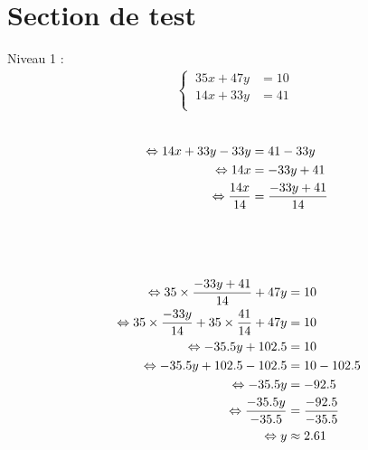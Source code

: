 \documentclass{article}%
\begin{document}
%
\normalsize%
\fontsize{12}{10}%
\selectfont%
\section*{Section de test}%
\label{sec:Sectiondetest}%
Niveau 1 :%
\begin{align*}%
\begin{cases}%
\  35x + 47y &= 10 \\%
\  14x + 33y &= 41 \\%
\end{cases}%
\\%
\end{align*}%
\ \\%
\vspace{5mm}%
\newline%
\begin{align*}%
\  \Leftrightarrow 14x + 33y - 33y &= 41 - 33y \\%
\vspace{5mm}%
\newline%
\  \Leftrightarrow 14x &= -33y + 41\\%
\vspace{5mm}%
\newline%
\  \Leftrightarrow \frac{14x}{14} &= \frac{-33y + 41}{14}\\%
\vspace{5mm}%
\newline%
\end{align*}%
\\%
\ \\%
\vspace{5mm}%
\newline%
\begin{align*}%
\ \Leftrightarrow  35 \times \frac{-33y + 41}{14} + 47y &= 10\\%
\vspace{5mm}%
\newline%
\ \Leftrightarrow  35 \times \frac{-33y}{14} + 35 \times \frac{41}{14} + 47y &= 10\\%
\vspace{5mm}%
\newline%
\ \Leftrightarrow  -35.5y + 102.5 &= 10\\%
\vspace{5mm}%
\newline%
\ \Leftrightarrow  -35.5y + 102.5 - 102.5 &= 10 - 102.5\\%
\vspace{5mm}%
\newline%
\ \Leftrightarrow  -35.5y  &= -92.5\\%
\vspace{5mm}%
\newline%
\ \Leftrightarrow  \frac{-35.5y}{-35.5}  &= \frac{-92.5}{-35.5}\\%
\vspace{5mm}%
\newline%
\ \Leftrightarrow  y  &\approx 2.61\\%
\vspace{5mm}%
\newline%
\end{align*}%
\end{document}
